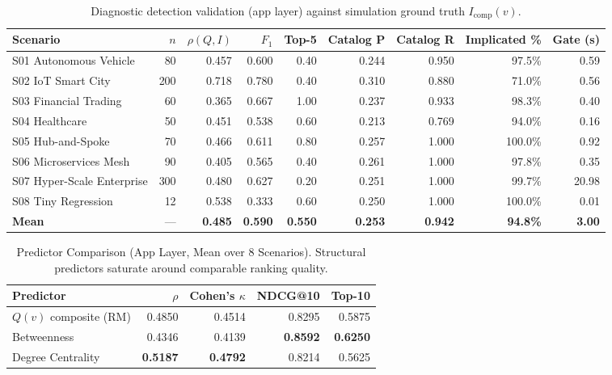 \begin{table}[htbp]
\centering
\footnotesize
\setlength{\tabcolsep}{3pt}
\caption{Diagnostic detection validation (app layer) against simulation ground truth $I_{\text{comp}}(v)$.}
\label{tab:detection_results}
\begin{tabular}{lrrrrrrrr}
\toprule
\textbf{Scenario} & $n$ & $\rho(Q, I)$ & $F_1$ & \textbf{Top-5} & \textbf{Catalog P} & \textbf{Catalog R} & \textbf{Implicated \%} & \textbf{Gate (s)} \\
\midrule
S01 Autonomous Vehicle & 80 & 0.457 & 0.600 & 0.40 & 0.244 & 0.950 & 97.5\% & 0.59 \\
S02 IoT Smart City & 200 & 0.718 & 0.780 & 0.40 & 0.310 & 0.880 & 71.0\% & 0.56 \\
S03 Financial Trading & 60 & 0.365 & 0.667 & 1.00 & 0.237 & 0.933 & 98.3\% & 0.40 \\
S04 Healthcare & 50 & 0.451 & 0.538 & 0.60 & 0.213 & 0.769 & 94.0\% & 0.16 \\
S05 Hub-and-Spoke & 70 & 0.466 & 0.611 & 0.80 & 0.257 & 1.000 & 100.0\% & 0.92 \\
S06 Microservices Mesh & 90 & 0.405 & 0.565 & 0.40 & 0.261 & 1.000 & 97.8\% & 0.35 \\
S07 Hyper-Scale Enterprise & 300 & 0.480 & 0.627 & 0.20 & 0.251 & 1.000 & 99.7\% & 20.98 \\
S08 Tiny Regression & 12 & 0.538 & 0.333 & 0.60 & 0.250 & 1.000 & 100.0\% & 0.01 \\
\midrule
\textbf{Mean} & --- & \textbf{0.485} & \textbf{0.590} & \textbf{0.550} & \textbf{0.253} & \textbf{0.942} & \textbf{94.8\%} & \textbf{3.00} \\
\bottomrule
\end{tabular}
\end{table}

\begin{table}[htbp]
\centering
\small
\caption{Predictor Comparison (App Layer, Mean over 8 Scenarios). Structural predictors saturate around comparable ranking quality.}
\label{tab:predictor_comparison}
\begin{tabular}{lrrrr}
\toprule
\textbf{Predictor} & $\rho$ & \textbf{Cohen's $\kappa$} & \textbf{NDCG@10} & \textbf{Top-10} \\
\midrule
$Q(v)$ composite (RM) & 0.4850 & 0.4514 & 0.8295 & 0.5875 \\
Betweenness & 0.4346 & 0.4139 & \textbf{0.8592} & \textbf{0.6250} \\
Degree Centrality & \textbf{0.5187} & \textbf{0.4792} & 0.8214 & 0.5625 \\
\bottomrule
\end{tabular}
\end{table}

